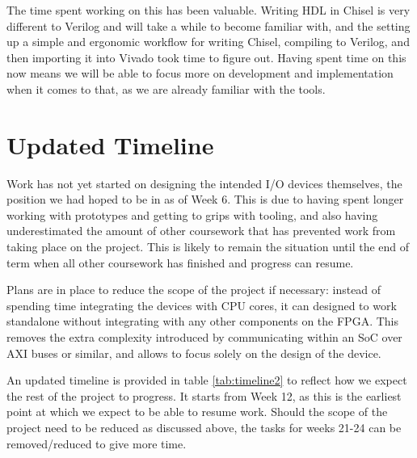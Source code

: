 \documentclass[a4paper,fleqn,12pt]{article}
\begin{document}
The time spent working on this has been valuable. Writing HDL in Chisel is very different to Verilog and will take a while to become familiar with, and the setting up a simple and ergonomic workflow for writing Chisel, compiling to Verilog, and then importing it into Vivado took time to figure out. Having spent time on this now means we will be able to focus more on development and implementation when it comes to that, as we are already familiar with the tools.

\section{Updated Timeline}

Work has not yet started on designing the intended I/O devices themselves, the position we had hoped to be in as of Week 6. This is due to having spent longer working with prototypes and getting to grips with tooling, and also having underestimated the amount of other coursework that has prevented work from taking place on the project. This is likely to remain the situation until the end of term when all other coursework has finished and progress can resume.

Plans are in place to reduce the scope of the project if necessary: instead of spending time integrating the devices with CPU cores, it can designed to work standalone without integrating with any other components on the FPGA. This removes the extra complexity introduced by communicating within an SoC over AXI buses or similar, and allows to focus solely on the design of the device.

An updated timeline is provided in table \ref{tab:timeline2} to reflect how we expect the rest of the project to progress. It starts from Week 12, as this is the earliest point at which we expect to be able to resume work. Should the scope of the project need to be reduced as discussed above, the tasks for weeks 21-24 can be removed/reduced to give more time.
\end{document}

